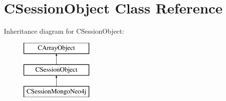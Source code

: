 \hypertarget{class_c_session_object}{\section{C\-Session\-Object Class Reference}
\label{class_c_session_object}
}
Inheritance diagram for C\-Session\-Object\-:\begin{figure}[H]
\begin{center}
\leavevmode
\includegraphics[height=3.000000cm]{class_c_session_object}
\end{center}
\end{figure}
